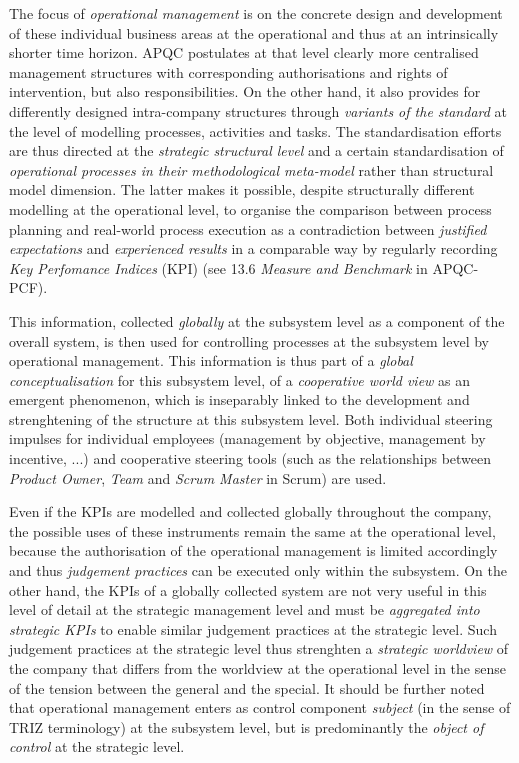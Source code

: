 \documentclass[11pt,a4paper]{article}
\begin{document}
The focus of \emph{operational management} is on the concrete design and
development of these individual business areas at the operational and thus at
an intrinsically shorter time horizon.  APQC postulates at that level clearly
more centralised management structures with corresponding authorisations and
rights of intervention, but also responsibilities. On the other hand, it also
provides for differently designed intra-company structures through
\emph{variants of the standard} at the level of modelling processes,
activities and tasks. The standardisation efforts are thus directed at the
\emph{strategic structural level} and a certain standardisation of
\emph{operational processes in their methodological meta-model} rather than
structural model dimension. The latter makes it possible, despite structurally
different modelling at the operational level, to organise the comparison
between process planning and real-world process execution as a contradiction
between \emph{justified expectations} and \emph{experienced results} in a
comparable way by regularly recording \emph{Key Perfomance Indices} (KPI) (see
13.6 \emph{Measure and Benchmark} in APQC-PCF).

This information, collected \emph{globally} at the subsystem level as a
component of the overall system, is then used for controlling processes at the
subsystem level by operational management. This information is thus part of a
\emph{global conceptualisation} for this subsystem level, of a
\emph{cooperative world view} as an emergent phenomenon, which is inseparably
linked to the development and strenghtening of the structure at this subsystem
level.  Both individual steering impulses for individual employees (management
by objective, management by incentive, ...) and cooperative steering tools
(such as the relationships between \emph{Product Owner}, \emph{Team} and
\emph{Scrum Master} in Scrum) are used.

Even if the KPIs are modelled and collected globally throughout the company,
the possible uses of these instruments remain the same at the operational
level, because the authorisation of the operational management is limited
accordingly and thus \emph{judgement practices} can be executed only within
the subsystem. On the other hand, the KPIs of a globally collected system are
not very useful in this level of detail at the strategic management level and
must be \emph{aggregated into strategic KPIs} to enable similar judgement
practices at the strategic level. Such judgement practices at the strategic
level thus strenghten a \emph{strategic worldview} of the company that differs
from the worldview at the operational level in the sense of the tension
between the general and the special. It should be further noted that
operational management enters as control component \emph{subject} (in the
sense of TRIZ terminology) at the subsystem level, but is predominantly the
\emph{object of control} at the strategic level.
\end{document}
